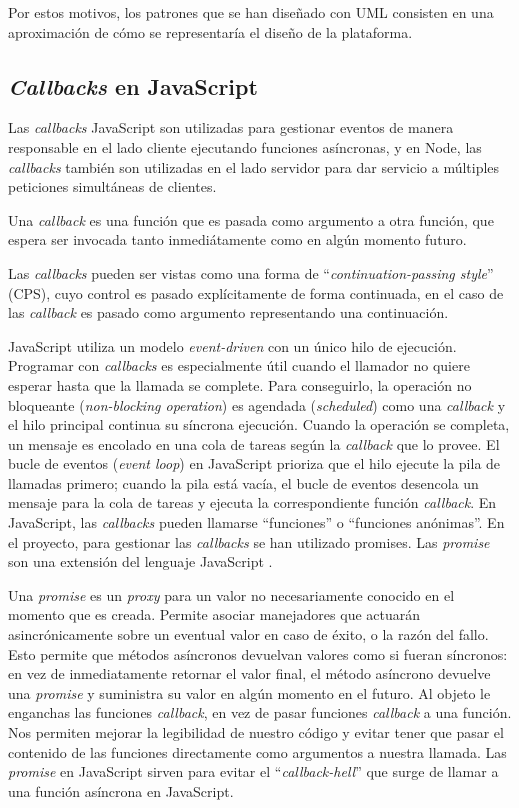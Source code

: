 Por estos motivos, los patrones que se han diseñado con UML consisten en una aproximación de cómo se representaría el diseño de la plataforma.


\subsection{	\textit{Callbacks} en JavaScript}
Las \textit{callbacks} JavaScript son utilizadas para gestionar eventos de manera responsable en el lado cliente ejecutando funciones asíncronas, y en Node, las \textit{callbacks} también son utilizadas en el lado servidor para dar servicio a múltiples peticiones simultáneas de clientes.


Una \textit{callback} es una función que es pasada como argumento a otra función, que espera ser invocada tanto inmediátamente como en algún momento futuro.


Las \textit{callbacks} pueden ser vistas como una forma de ``\textit{continuation-passing style}'' (CPS), cuyo control es pasado explícitamente de forma continuada, en el caso de las \textit{callback} es pasado como argumento representando una continuación.


JavaScript utiliza un modelo \textit{event-driven} con un único hilo de ejecución. Programar con \textit{callbacks} es especialmente útil cuando el llamador no quiere esperar hasta que la llamada se complete. Para conseguirlo, la operación no bloqueante (\textit{non-blocking operation}) es agendada (\textit{scheduled}) como una \textit{callback} y el hilo principal continua su síncrona ejecución. Cuando la operación se completa, un mensaje es encolado en una cola de tareas según la \textit{callback} que lo provee. El bucle de eventos (\textit{event loop}) en JavaScript prioriza que el hilo ejecute la pila de llamadas primero; cuando la pila está vacía, el bucle de eventos desencola un mensaje para la cola de tareas y ejecuta la correspondiente función \textit{callback}.
En JavaScript, las \textit{callbacks} pueden llamarse ``funciones'' o ``funciones anónimas''.
En el proyecto, para gestionar las \textit{callbacks} se han utilizado promises. Las \textit{promise} son una extensión del lenguaje JavaScript \cite{keheliyagallabaalimesbahivanbeschastnikh2015}.


Una \textit{promise} es un \textit{proxy} para un valor no necesariamente conocido en el momento que es creada. Permite asociar manejadores que actuarán asincrónicamente sobre un eventual valor en caso de éxito, o la razón del fallo. Esto permite que métodos asíncronos devuelvan valores como si fueran síncronos: en vez de inmediatamente retornar el valor final, el método asíncrono devuelve una \textit{promise} y suministra su valor en algún momento en el futuro\cite{promise_objeto}. Al objeto le enganchas las funciones \textit{callback}, en vez de pasar funciones \textit{callback} a una función\cite{promise_mozilla}. Nos permiten mejorar la legibilidad de nuestro código y evitar tener que pasar el contenido de las funciones directamente como argumentos a nuestra llamada. Las \textit{promise} en JavaScript sirven para evitar el ``\textit{callback-hell}'' que surge de llamar a una función asíncrona en JavaScript. 


